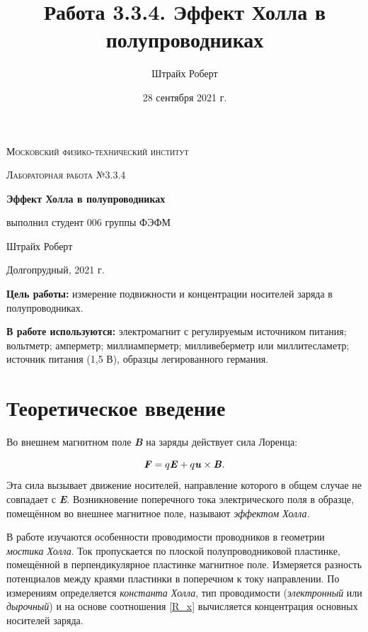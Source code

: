 \documentclass[a4paper, 12pt]{article}
\author{Штрайх Роберт}
\title{Работа 3.3.4. Эффект Холла в полупроводниках}
\date{28 сентября 2021 г.}
\begin{document}
\begin{titlepage}
	\centering
	\vspace{5cm}
	{\scshape\LARGE Московский физико-технический институт \par}
	\vspace{4cm}
	{\scshape\Large Лабораторная работа №3.3.4 \par}
	\vspace{1cm}
	{\huge\bfseries Эффект Холла в полупроводниках \par}
	\vspace{1cm}
	\vfill
\begin{flushright}
	{\Large выполнил студент 006 группы ФЭФМ}\par
	\vspace{0.3cm}
	{\Large Штрайх Роберт}
\end{flushright}
	

	\vfill

	Долгопрудный, 2021 г.
\end{titlepage}

\newpage
\textbf{Цель работы:} измерение подвижности и концентрации носителей заряда в полупроводниках.

\textbf{В работе используются:} электромагнит с регулируемым источником питания; вольтметр; амперметр; миллиамперметр; милливеберметр или миллитесламетр; источник питания (1,5 В), образцы легированного германия.

\section{Теоретическое введение}

Во внешнем магнитном поле \textbf{\textit{B}} на заряды действует сила Лоренца:

\begin{equation} \label{Lorens}
\textbf{\textit{F}} = q\textbf{\textit{E}} + q\textbf{\textit{u}} \times \textbf{\textit{B}}.
\end{equation}
Эта сила вызывает движение носителей, направление которого в общем случае не совпадает с \textbf{\textit{E}}. Возникновение поперечного тока электрического поля в образце, помещённом во внешнее магнитное поле, называют \textit{эффектом Холла.}

В работе изучаются особенности проводимости проводников в геометрии \textit{мостика Холла}. Ток пропускается по плоской полупроводниковой пластинке, помещённой в перпендикулярное пластинке магнитное поле. Измеряется разность потенциалов между краями пластинки в поперечном к току направлении. По измерениям определяется \textit{константа Холла}, тип проводимости (\textit{электронный} или \textit{дырочный}) и на основе соотношения \eqref{R_x} вычисляется концентрация основных носителей заряда.
\end{document}
